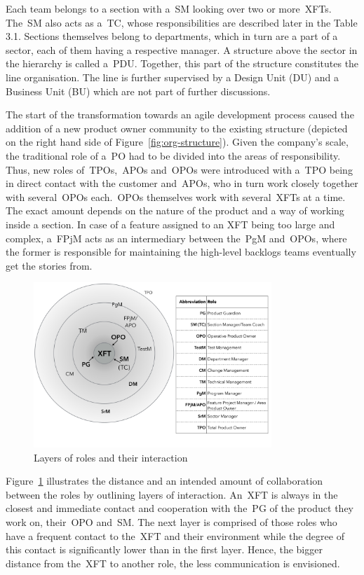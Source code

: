 Each team belongs to a section with a~\ac{SM} looking over two or more~\acp{XFT}. The~\ac{SM} also acts as a~\ac{TC}, whose responsibilities are described later in the Table 3.1.
Sections themselves belong to departments, which in turn are a part of a sector, each of them having a respective manager. A structure above the sector in the hierarchy is called a~\ac{PDU}. Together, this part of the structure constitutes the line organisation. The line is further supervised by a Design Unit (DU) and a Business Unit (BU) which are not part of further discussions.

The start of the transformation towards an agile development process caused the addition of a new product owner community to the existing structure (depicted on the right hand side of Figure~\ref{fig:org-structure}). Given the company's scale, the traditional role of a~\ac{PO} had to be divided into the areas of responsibility. Thus, new roles of~\acp{TPO},~\acp{APO} and~\acp{OPO} were introduced with a~\ac{TPO} being in direct contact with the customer and~\acp{APO}, who in turn work closely together with several~\acp{OPO} each.~\acp{OPO} themselves work with several~\acp{XFT} at a time. The exact amount depends on the nature of the product and a way of working inside a section. In case of a feature assigned to an \ac{XFT} being too large and complex, a~\ac{FPjM} acts as an intermediary between the~\ac{PgM} and~\acp{OPO}, where the former is responsible for maintaining the high-level backlogs teams eventually get the stories from.

\begin{figure}[h!]
  \centering
  \includegraphics[width=0.8\textwidth]{figures/onion.pdf}
  \caption{Layers of roles and their interaction}
  \label{onion}
\end{figure}

Figure~\ref{onion} illustrates the distance and an intended amount of collaboration between the roles by outlining layers of interaction. An~\ac{XFT} is always in the closest and immediate contact and cooperation with the~\ac{PG} of the product they work on, their~\ac{OPO} and~\ac{SM}. The next layer is comprised of those roles who have a frequent contact to the~\ac{XFT} and their environment while the degree of this contact is significantly lower than in the first layer. Hence, the bigger distance from the~\ac{XFT} to another role, the less communication is envisioned.

